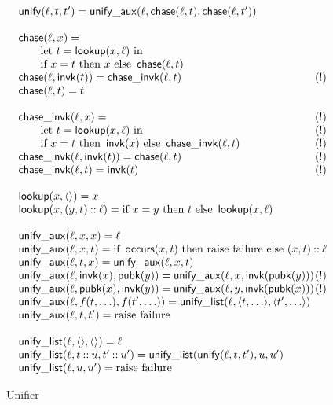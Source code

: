 \documentclass[12pt]{report}
\theoremstyle{definition}
\begin{document}
\begin{figure}
$$
\begin{array}{l}
\cn{unify}(\ell, t, t') = \cn{unify\_aux}(\ell,\cn{chase}(\ell, t),
\cn{chase}(\ell, t'))
\\
\\\cn{chase}(\ell, x)=
\\ \qquad\mbox{let }t=\cn{lookup}(x,\ell)\mbox{ in}
\\ \qquad \mbox{if }x = t\mbox{ then }x
\mbox{ else }\cn{chase}(\ell, t)
\\\cn{chase}(\ell, \cn{invk}(t))=\cn{chase\_invk}(\ell, t)\hfill(!)
\\\cn{chase}(\ell, t)=t
\\
\\\cn{chase\_invk}(\ell, x)=\hfill(!)
\\ \qquad\mbox{let }t=\cn{lookup}(x,\ell)\mbox{ in}\hfill(!)
\\ \qquad \mbox{if }x = t\mbox{ then }\cn{invk}(x)
\mbox{ else }\cn{chase\_invk}(\ell, t)\hfill(!)
\\\cn{chase\_invk}(\ell, \cn{invk}(t))=\cn{chase}(\ell, t)\hfill(!)
\\\cn{chase\_invk}(\ell, t)=\cn{invk}(t)\hfill(!)
\\
\\\cn{lookup}(x,\seq{})=x
\\\cn{lookup}(x,(y,t)\cons\ell)=
\mbox{if }x=y\mbox{ then }t\mbox{ else }
\cn{lookup}(x, \ell)
\\
\\\cn{unify\_aux}(\ell,x,x) =\ell
\\\cn{unify\_aux}(\ell,x,t) =\mbox{if }\cn{occurs}(x, t)\mbox{ then raise failure else }
(x,t)\cons\ell
\\\cn{unify\_aux}(\ell,t,x) =\cn{unify\_aux}(\ell,x,t)
\\\cn{unify\_aux}(\ell,\cn{invk}(x),\cn{pubk}(y)) =
\cn{unify\_aux}(\ell, x, \cn{invk}(\cn{pubk}(y)))\hfill(!)
\\\cn{unify\_aux}(\ell,\cn{pubk}(x),\cn{invk}(y)) =
\cn{unify\_aux}(\ell, y, \cn{invk}(\cn{pubk}(x)))\hfill(!)
\\\cn{unify\_aux}(\ell,f(t,\ldots),f(t',\ldots)) =
\cn{unify\_list}(\ell,\seq{t,\ldots},\seq{t',\ldots})
\\\cn{unify\_aux}(\ell,t,t') =\mbox{raise failure}
\\
\\\cn{unify\_list}(\ell,\seq{},\seq{}) =\ell
\\\cn{unify\_list}(\ell,t\cons u,t'\cons u') =
\cn{unify\_list}(\cn{unify}(\ell,t,t'), u, u')
\\\cn{unify\_list}(\ell,u,u') =\mbox{raise failure}
\end{array}
$$
\caption{Unifier}\label{fig:unifier}
\end{figure}
\end{document}
